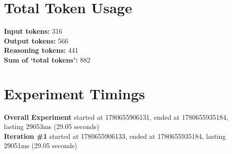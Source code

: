 \documentclass{article}
\begin{document}
\section*{Total Token Usage}
\textbf{Input tokens: }316
\\\textbf{Output tokens: }566
\\\textbf{Reasoning tokens: }441
\\\textbf{Sum of `total tokens': }882
\section*{Experiment Timings}
\textbf{Overall Experiment} started at 1780655906131, ended at 1780655935184, lasting 29053ms (29.05 seconds)
\\\textbf{Iteration \#1} started at 1780655906133, ended at 1780655935184, lasting 29051ms (29.05 seconds)
\end{document}
